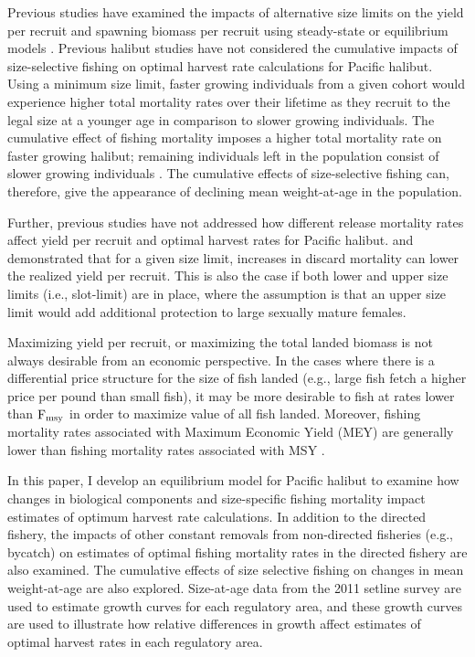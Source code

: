 Previous studies have examined the impacts of alternative size limits on the yield per recruit and spawning biomass per recruit using steady-state or equilibrium models \citep{clark1995re}.  Previous halibut studies have not considered the cumulative impacts of size-selective fishing on optimal harvest rate calculations for Pacific halibut.  Using a minimum size limit, faster growing individuals from a given cohort would experience higher total mortality rates over their lifetime as they recruit to the legal size at a younger age in comparison to slower growing individuals. The cumulative effect of fishing mortality imposes a higher total mortality rate on faster growing halibut; remaining individuals left in the population consist of slower growing individuals \citep{Taylor2005}.  The cumulative effects of size-selective fishing can, therefore, give the appearance of declining mean weight-at-age in the population.

Further, previous studies have not addressed how different release mortality rates affect  yield per recruit and optimal harvest rates for Pacific halibut.  \cite{coggins2007ecm} and \cite{pineiii2008car} demonstrated that for a given size limit, increases in discard mortality can lower the realized yield per recruit. This is also the case if both lower and upper size limits (i.e., slot-limit) are in place, where the assumption is that an upper size limit would add additional protection to large sexually mature females.

Maximizing  yield per recruit, or maximizing the total landed biomass is not always desirable from an economic perspective.  In the cases where there is a differential price structure for the size of fish landed (e.g., large fish fetch a higher price per pound  than small fish), it may be more desirable to fish at rates lower than $\rm{F_{msy}}$ in order to maximize value of all fish landed.  Moreover, fishing mortality rates associated with Maximum Economic Yield (MEY) are generally lower than fishing mortality rates associated with MSY \citep{gordon1954economic}.

In this paper, I develop an equilibrium model for Pacific halibut to examine how changes in biological components and size-specific fishing mortality impact estimates of optimum harvest rate calculations.  In addition to the directed fishery, the impacts of other constant removals from non-directed fisheries (e.g., bycatch) on estimates of optimal fishing mortality rates in the directed fishery are also examined.  The cumulative effects of size selective fishing on changes in mean weight-at-age are also explored. Size-at-age data from the 2011 setline survey are used to estimate growth curves for each regulatory area, and these growth curves are used to illustrate how relative differences in growth affect estimates of optimal harvest rates in each regulatory area.





